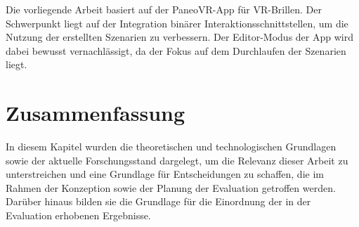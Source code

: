 
Die vorliegende Arbeit basiert auf der PaneoVR-App für VR-Brillen. Der Schwerpunkt liegt auf der Integration binärer Interaktionsschnittstellen, um die Nutzung der erstellten Szenarien zu verbessern. Der Editor-Modus der App wird dabei bewusst vernachlässigt, da der Fokus auf dem Durchlaufen der Szenarien liegt.

\section{Zusammenfassung} 

In diesem Kapitel wurden die theoretischen und technologischen Grundlagen sowie der aktuelle Forschungsstand dargelegt, um die Relevanz dieser Arbeit zu unterstreichen und eine Grundlage für Entscheidungen zu schaffen, die im Rahmen der Konzeption sowie der Planung der Evaluation getroffen werden. Darüber hinaus bilden sie die Grundlage für die Einordnung der in der Evaluation erhobenen Ergebnisse.

